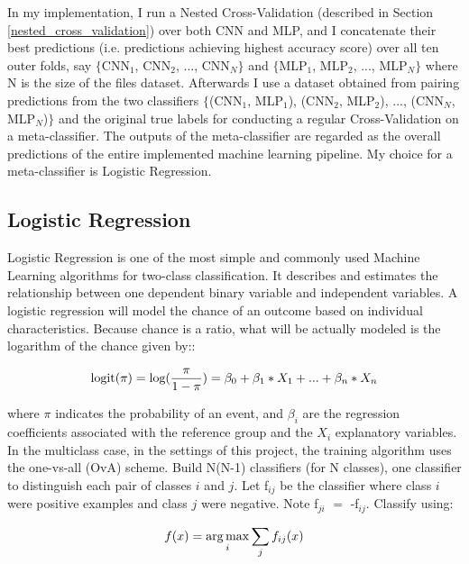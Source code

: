 In my implementation, I run a Nested Cross-Validation (described in Section \ref{nested_cross_validation}) over both CNN and MLP, and I concatenate their best predictions (i.e. predictions achieving highest accuracy score) over all ten outer folds, say $\{$CNN$_1$, CNN$_2$, ..., CNN$_N$$\}$ and $\{$MLP$_1$, MLP$_2$, ..., MLP$_N$$\}$ where N is the size of the files dataset. 
Afterwards I use a dataset obtained from pairing predictions from the two classifiers $\{$(CNN$_1$, MLP$_1$), (CNN$_2$, MLP$_2$), ..., (CNN$_N$, MLP$_N$)$\}$ and the original true labels for conducting a regular Cross-Validation on a meta-classifier. The outputs of the meta-classifier are regarded as the overall predictions of the entire implemented machine learning pipeline. My choice for a meta-classifier is Logistic Regression. \\

\subsection{Logistic Regression}

Logistic Regression is one of the most simple and commonly used Machine Learning algorithms for two-class classification. It describes and estimates the relationship between one dependent binary variable and independent variables. A logistic regression will model the chance of an outcome based on individual characteristics. Because chance is a ratio, what will be actually modeled is the logarithm of the chance given by:: 

\begin{equation}
    \centering
    \text{logit($\pi$)} = \text{log}(\frac{\pi}{1 - \pi}) = \beta_0 + \beta_1 * X_1 + ... + \beta_n * X_n 
\end{equation} 

where $\pi$ indicates the probability of an event, and $\beta_i$ are the regression coefficients associated with the reference group and the $X_i$ explanatory variables. \\

In the multiclass case, in the settings of this project, the training algorithm uses the one-vs-all (OvA) scheme.
Build N(N-1) classifiers (for N classes), one classifier to distinguish each pair of classes $i$ and $j$. Let f$_{ij}$ be the classifier where class $i$ were positive examples and class $j$ were negative. Note f$_{ji}$ $=$ -f$_{ij}$. Classify using:

\begin{equation}
    \centering
    f(x) = \argmax_{i} \sum_{j} f_{ij}(x)
\end{equation} 

